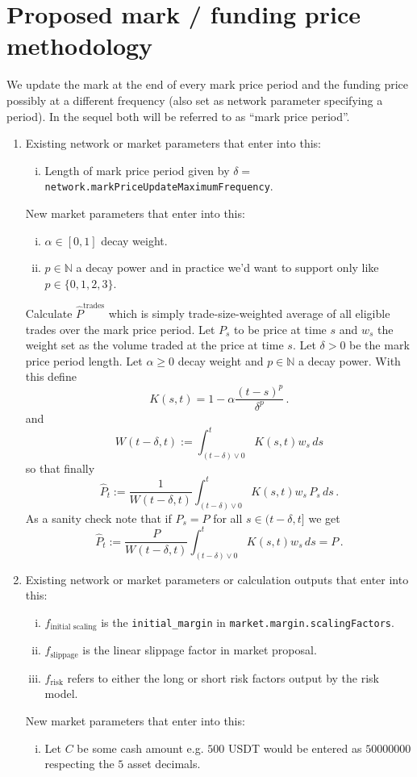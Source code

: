 \documentclass[10pt]{article}
\begin{document}
\section{Proposed mark / funding price methodology}
We update the mark at the end of every mark price period and the funding price possibly at a different frequency (also set as network parameter specifying a period). 
In the sequel both will be referred to as ``mark price period''.
\begin{enumerate}
\item 
Existing network or market parameters that enter into this:
\begin{enumerate}[i)]
\item Length of mark price period given by $\delta = $\texttt{network.markPriceUpdateMaximumFrequency}.
\end{enumerate}
New market parameters that enter into this:
\begin{enumerate}[i)]
\item $\alpha \in [0,1]$ decay weight. 
\item $p \in \mathbb N$ a decay power and in practice we'd want to support only like $p \in \{0,1,2,3\}$.
\end{enumerate}

Calculate $\hat P^{\text{trades}}$ which is simply trade-size-weighted average of all eligible trades over the mark price period. 
Let $P_s$ to be price at time $s$ and $w_s$ the weight set as the volume traded at the price at time $s$.
Let $\delta > 0$ be the mark price period length. 
Let $\alpha \geq 0$ decay weight and $p\in \mathbb N$ a decay power. 
With this define
\[
K(s,t) = 1 - \alpha\frac{(t-s)^p}{\delta^p}\,.
\]
and 
\[
W(t-\delta, t) := \int_{(t-\delta) \vee 0}^t K(s,t) w_s \,ds
\]
so that finally
\[
\hat P_t := \frac{1}{W(t-\delta, t)} \int_{(t-\delta) \vee 0}^t K(s,t) w_s \,P_s \,ds\,.
\]
As a sanity check note that if $P_s = P$ for all $s\in (t-\delta, t]$ we get 
\[
\hat P_t := \frac{P}{W(t-\delta, t)} \int_{(t-\delta) \vee 0}^t K(s,t) w_s \,ds = P\,.
\]


\item 
Existing network or market parameters or calculation outputs that enter into this:
\begin{enumerate}[i)]
\item $f_\text{initial scaling}$ is the \texttt{initial\_margin} in \texttt{market.margin.scalingFactors}.
\item $f_\text{slippage}$ is the linear slippage factor in market proposal.
\item $f_\text{risk}$ refers to either the long or short risk factors output by the risk model. 
\end{enumerate}
New market parameters that enter into this:
\begin{enumerate}[i)]
\item Let $C$ be some cash amount e.g. $500$ USDT would be entered as $500 00000$ respecting the $5$ asset decimals.
\end{enumerate}



\end{enumerate}
\end{document}
